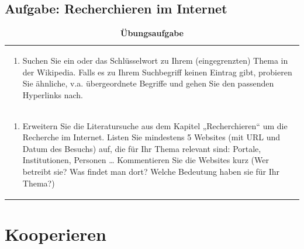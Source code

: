 \documentclass[]{book}
\providecommand{\tightlist}{%
  \setlength{\itemsep}{0pt}\setlength{\parskip}{0pt}}
\theoremstyle{definition}
\theoremstyle{definition}
\theoremstyle{definition}
\theoremstyle{remark}
\begin{document}
\section{Aufgabe: Recherchieren im
Internet}\label{aufgabe-recherchieren-im-internet}

\begin{longtable}[]{@{}l@{}}
\caption{\textbf{\label{tab:aufgabe3-test} Übungsaufgabe}}\tabularnewline
\toprule
\begin{minipage}[t]{0.97\columnwidth}\raggedright\strut
\begin{enumerate}
\def\labelenumi{\arabic{enumi}.}
\tightlist
\item
  Suchen Sie ein oder das Schlüsselwort zu Ihrem (eingegrenzten) Thema
  in der Wikipedia. Falls es zu Ihrem Suchbegriff keinen Eintrag gibt,
  probieren Sie ähnliche, v.a. übergeordnete Begriffe und gehen Sie den
  passenden Hyperlinks nach. \vspace{-6mm}
\end{enumerate}\strut
\end{minipage}\tabularnewline
\begin{minipage}[t]{0.97\columnwidth}\raggedright\strut
\begin{enumerate}
\def\labelenumi{\arabic{enumi}.}
\setcounter{enumi}{1}
\tightlist
\item
  Erweitern Sie die Literatursuche aus dem Kapitel „Recherchieren`` um
  die Recherche im Internet. Listen Sie mindestens 5 Websites (mit URL
  und Datum des Besuchs) auf, die für Ihr Thema relevant sind: Portale,
  Institutionen, Personen \ldots{} Kommentieren Sie die Websites kurz
  (Wer betreibt sie? Was findet man dort? Welche Bedeutung haben sie für
  Ihr Thema?)
\end{enumerate}\strut
\end{minipage}\tabularnewline
\bottomrule
\end{longtable}

\chapter{Kooperieren}\label{kooperieren}
\end{document}
